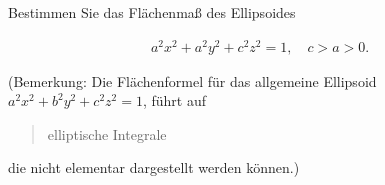 
\begin{exercise}

Bestimmen Sie das Flächenmaß des Ellipsoides

\begin{align*}
    a^2 x^2 + a^2 y^2 + c^2 z^2 = 1,
    \quad
    c > a > 0.
\end{align*}

(Bemerkung: Die Flächenformel für das allgemeine Ellipsoid $a^2 x^2 + b^2 y^2 + c^2 z^2 = 1$, führt auf \blockquote{elliptische Integrale} die nicht elementar dargestellt werden können.)

\end{exercise}


